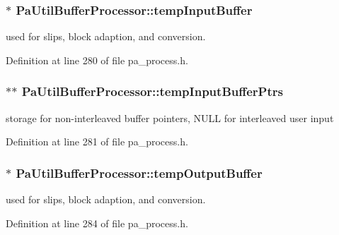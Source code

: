 \subsubsection[{\texorpdfstring{temp\+Input\+Buffer}{tempInputBuffer}}]{$\ast$ Pa\+Util\+Buffer\+Processor\+::temp\+Input\+Buffer}\hypertarget{struct_pa_util_buffer_processor_a327f8e240df961caa6c47bb9a35a9b76}{}\label{struct_pa_util_buffer_processor_a327f8e240df961caa6c47bb9a35a9b76}
used for slips, block adaption, and conversion. 

Definition at line 280 of file pa\+\_\+process.\+h.

\subsubsection[{\texorpdfstring{temp\+Input\+Buffer\+Ptrs}{tempInputBufferPtrs}}]{$\ast$$\ast$ Pa\+Util\+Buffer\+Processor\+::temp\+Input\+Buffer\+Ptrs}\hypertarget{struct_pa_util_buffer_processor_ad4fa78d30f36f82c45278b9fda2322f9}{}\label{struct_pa_util_buffer_processor_ad4fa78d30f36f82c45278b9fda2322f9}
storage for non-\/interleaved buffer pointers, N\+U\+LL for interleaved user input 

Definition at line 281 of file pa\+\_\+process.\+h.

\subsubsection[{\texorpdfstring{temp\+Output\+Buffer}{tempOutputBuffer}}]{$\ast$ Pa\+Util\+Buffer\+Processor\+::temp\+Output\+Buffer}\hypertarget{struct_pa_util_buffer_processor_a6aaded76991a6014bc78290fca38124e}{}\label{struct_pa_util_buffer_processor_a6aaded76991a6014bc78290fca38124e}
used for slips, block adaption, and conversion. 

Definition at line 284 of file pa\+\_\+process.\+h.

